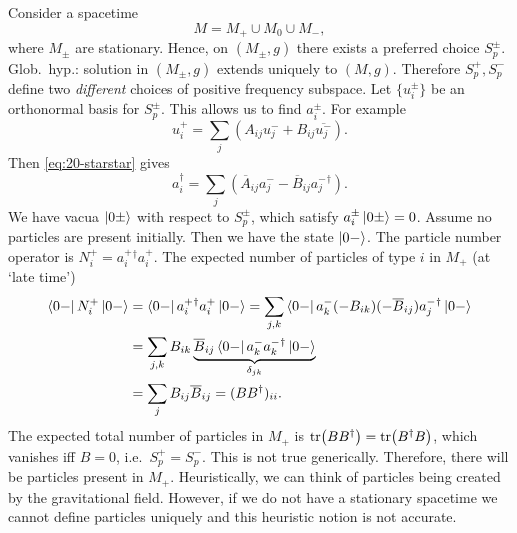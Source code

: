 Consider a spacetime
\begin{equation}
  M = M_+ \cup M_0 \cup M_-,
\end{equation}
where $M_{\pm}$ are stationary.
Hence, on $(M_{\pm}, g)$ there exists a preferred choice $S_p^{\pm}$.
Glob.~hyp.: solution in $(M_{\pm}, g)$ extends uniquely to $(M, g)$.
Therefore $S_p^+, S_p^-$ define two \emph{different} choices of positive frequency subspace.
Let $\{u_i^{\pm}\}$ be an orthonormal basis for $S_p^{\pm}$. This allows us to find $a_i^{\pm}$.
For example
\begin{equation}
  u_i^{+} = \sum_j \left( A_{ij} u^-_j + B_{ij} \overline{u^-_j}{} \right).
\end{equation}
Then \eqref{eq:20-starstar} gives
\begin{equation}
  a_i^{\dagger} = \sum_j \left( \overline{A}{}_{ij} a^-_j - \overline{B}{}_{ij} a^-_j{}^{\dagger} \right).
\end{equation}
We have vacua $\ket{0 \pm}$ with respect to $S_p^{\pm}$, which satisfy $a^{\pm}_i \ket{0 \pm } = 0$.
Assume no particles are present initially.
Then we have the state $\ket{0 -}$. The particle number operator is $N^+_i = a^+_i{}^{\dagger} a^+_i$.
The expected number of particles of type $i$ in $M_+$ (at `late time')
\begin{align}
  \bra{0 -} N_i^+ \ket{0 - } &= \bra{0 - } a_i^+{}^{\dagger} a_i^+ \ket{0 - } = \sum_{j, k} \bra{0 - } a_k^- (- B_{ik}) (-\overline{B}{}_{ij}) a_j^-{}^{\dagger} \ket{0 -} \\
  &= \sum_{j, k} B_{ik} \underbrace{\overline{B}{}_{ij} \bra{0 - } a_k^- a_k^-{}^{\dagger} \ket{0 -}}_{\delta_{jk}} \\
  &= \sum_j B_{ij} \overline{B}{}_{ij} = (B B^{\dagger})_{ii}.
\end{align}
The expected total number of particles in $M_+$ is $\tr(B B^{\dagger}) = \tr(B^{\dagger} B)$, which vanishes iff $B = 0$, i.e.~$S_p^+ = S_p^-$.
This is not true generically.
Therefore, there will be particles present in $M_+$.
Heuristically, we can think of particles being created by the gravitational field. However, if we do not have a stationary spacetime we cannot define particles uniquely and this heuristic notion is not accurate.

